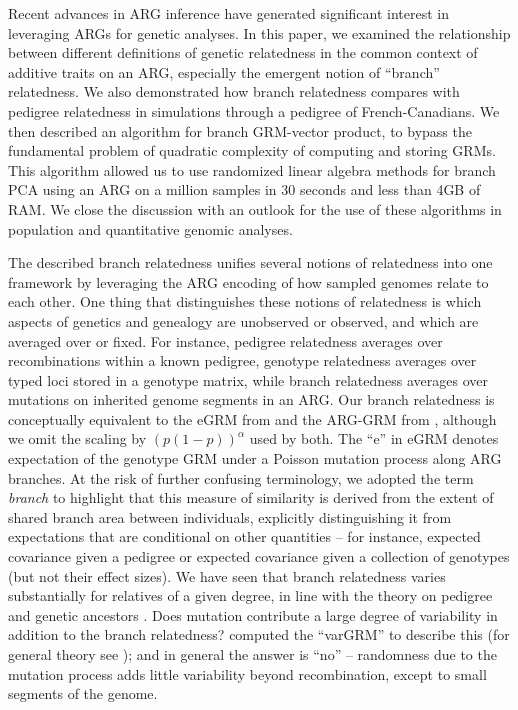 
Recent advances in ARG inference have generated significant interest in leveraging ARGs for genetic analyses.
%
In this paper, we examined the relationship between different definitions of genetic relatedness
in the common context of additive traits on an ARG,
especially the emergent notion of ``branch'' relatedness.
%
We also demonstrated how branch relatedness compares with pedigree relatedness in simulations through a pedigree of French-Canadians.
%
We then described an algorithm for branch GRM-vector product,
to bypass the fundamental problem of quadratic complexity of computing and storing GRMs.
%
This algorithm allowed us to use randomized linear algebra methods
for branch PCA using an ARG on a million samples in 30 seconds
and less than 4GB of RAM.
%
We close the discussion with an outlook for the use of these algorithms in population and quantitative genomic analyses.

The described branch relatedness unifies several notions of relatedness into one framework
by leveraging the ARG encoding of how sampled genomes relate to each other.
One thing that distinguishes these notions of relatedness
is which aspects of genetics and genealogy are unobserved or observed,
and which are averaged over or fixed.
For instance, pedigree relatedness averages over
recombinations within a known pedigree,
genotype relatedness averages over typed loci stored in a genotype matrix, 
while branch relatedness averages over mutations on
inherited genome segments in an ARG.
Our branch relatedness is conceptually equivalent to the eGRM from \cite{fan2022genealogical} and the ARG-GRM from \cite{zhang2023biobank},
although we omit the scaling by $(p(1-p))^\alpha$ used by both.
The ``e'' in eGRM denotes expectation of the genotype GRM under a Poisson mutation process along ARG branches. 
At the risk of further confusing terminology,
we adopted the term \textit{branch} to highlight that this measure of similarity is derived from the extent of shared branch area between individuals,
explicitly distinguishing it from expectations that are conditional
on other quantities -- for instance, expected covariance given a pedigree
or expected covariance given a collection of genotypes (but not their effect sizes).
We have seen that branch relatedness varies substantially
for relatives of a given degree, in line with the theory
on pedigree and genetic ancestors
\citep{chang1999recent, weir2006genetic, hill2011variation, thompson2013identity, garciacortes2013variance}.
Does mutation contribute a large degree of variability
in addition to the branch relatedness?
\citet{fan2022genealogical} computed the ``varGRM'' to describe this
(for general theory see \citet{ralph2019empirical});
and in general the answer is ``no'' --
randomness due to the mutation process adds little variability
beyond recombination, except to small segments of the genome.

